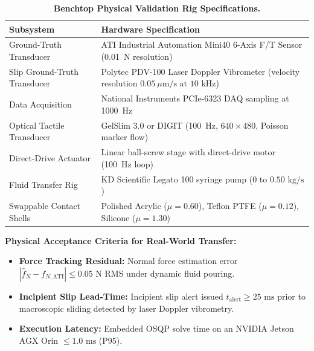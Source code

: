 \begin{table}[h]
\centering
\caption{\textbf{Benchtop Physical Validation Rig Specifications.}}
\label{tab:benchtop}
\small
\begin{tabular}{ll}
\toprule
\textbf{Subsystem} & \textbf{Hardware Specification} \\
\midrule
Ground-Truth Transducer & ATI Industrial Automation Mini40 6-Axis F/T Sensor (0.01~N resolution) \\
Slip Ground-Truth Transducer & Polytec PDV-100 Laser Doppler Vibrometer (velocity resolution $0.05\ \mu\text{m/s}$ at $10\text{ kHz}$) \\
Data Acquisition & National Instruments PCIe-6323 DAQ sampling at 1000~Hz \\
Optical Tactile Transducer & GelSlim 3.0 or DIGIT (100~Hz, $640\times 480$, Poisson marker flow) \\
Direct-Drive Actuator & Linear ball-screw stage with direct-drive motor (100~Hz loop) \\
Fluid Transfer Rig & KD Scientific Legato 100 syringe pump ($0\text{ to }0.50\text{ kg/s}$) \\
Swappable Contact Shells & Polished Acrylic ($\mu = 0.60$), Teflon PTFE ($\mu = 0.12$), Silicone ($\mu = 1.30$) \\
\bottomrule
\end{tabular}
\end{table}

\textbf{Physical Acceptance Criteria for Real-World Transfer:}
\begin{itemize}
    \item \textbf{Force Tracking Residual:} Normal force estimation error $|\hat{f}_N - f_{N, \text{ATI}}| \le 0.05\text{ N}$ RMS under dynamic fluid pouring.
    \item \textbf{Incipient Slip Lead-Time:} Incipient slip alert issued $t_{\text{alert}} \ge 25\text{ ms}$ prior to macroscopic sliding detected by laser Doppler vibrometry.
    \item \textbf{Execution Latency:} Embedded OSQP solve time on an NVIDIA Jetson AGX Orin $\le 1.0\text{ ms}$ (P95).
\end{itemize}

